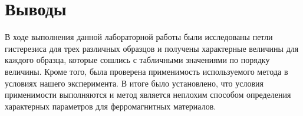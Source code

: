 \section{Выводы}

В ходе выполнения данной лабораторной работы были исследованы петли гистерезиса для трех различных образцов и получены характерные величины для каждого образца, которые сошлись с табличными значениями по порядку величины. Кроме того, была проверена применимость используемого метода в условиях нашего эксперимента. В итоге было установлено, что условия применимости выполняются и метод является неплохим способом определения характерных параметров для ферромагнитных материалов.
